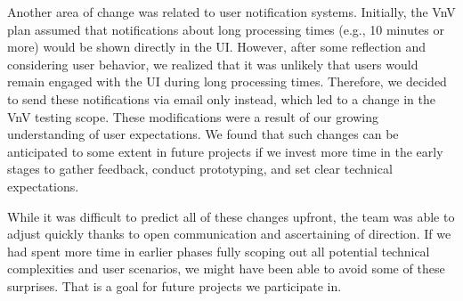 \documentclass[12pt, titlepage]{article}
\begin{document}
\begin{enumerate}
Another area of change was related to user notification systems. Initially, the VnV 
plan assumed that notifications about long processing times (e.g., 10 minutes or more) 
would be shown directly in the UI. However, after some reflection and considering user 
behavior, we realized that it was unlikely that users would remain engaged with the UI 
during long processing times. Therefore, we decided to send these notifications via 
email only instead, which led to a change in the VnV testing scope. These modifications were 
a result of our growing understanding of user expectations. We found that such changes 
can be anticipated to some extent in future projects if we invest more time in the 
early stages to gather feedback, conduct prototyping, and set clear technical expectations.

While it was difficult to predict all of these changes upfront, the team was able to adjust 
quickly thanks to open communication and ascertaining of direction. If we had spent more 
time in earlier phases fully scoping out all potential technical complexities and user 
scenarios, we might have been able to avoid some of these surprises. That is a goal for 
future projects we participate in.
\end{enumerate}
\end{document}
